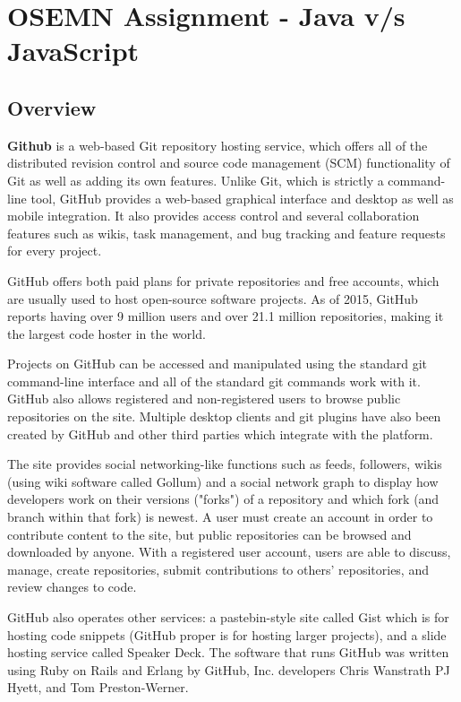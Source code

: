 \documentclass{article}\usepackage[]{graphicx}\usepackage[]{color}
\begin{document}
\section*{OSEMN Assignment - Java v/s JavaScript}
\subsection*{Overview}
\textbf{Github} is a web-based Git repository hosting service, which offers all of the distributed revision control and source code management (SCM) functionality of Git as well as adding its own features. Unlike Git, which is strictly a command-line tool, GitHub provides a web-based graphical interface and desktop as well as mobile integration. It also provides access control and several collaboration features such as wikis, task management, and bug tracking and feature requests for every project.
\smallskip
\par GitHub offers both paid plans for private repositories and free accounts, which are usually used to host open-source software projects. As of 2015, GitHub reports having over 9 million users and over 21.1 million repositories, making it the largest code hoster in the world. \smallskip
\par Projects on GitHub can be accessed and manipulated using the standard git command-line interface and all of the standard git commands work with it. GitHub also allows registered and non-registered users to browse public repositories on the site. Multiple desktop clients and git plugins have also been created by GitHub and other third parties which integrate with the platform. \smallskip
\par The site provides social networking-like functions such as feeds, followers, wikis (using wiki software called Gollum) and a social network graph to display how developers work on their versions ("forks") of a repository and which fork (and branch within that fork) is newest. \smallskip
A user must create an account in order to contribute content to the site, but public repositories can be browsed and downloaded by anyone. With a registered user account, users are able to discuss, manage, create repositories, submit contributions to others' repositories, and review changes to code. \smallskip
\par GitHub also operates other services: a pastebin-style site called Gist which is for hosting code snippets (GitHub proper is for hosting larger projects), and a slide hosting service called Speaker Deck. \smallskip
The software that runs GitHub was written using Ruby on Rails and Erlang by GitHub, Inc. developers Chris Wanstrath PJ Hyett, and Tom Preston-Werner. \smallskip
\end{document}
